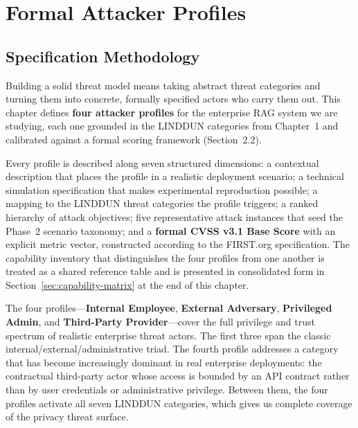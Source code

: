\documentclass[12pt, a4paper]{report}
\begin{document}
\chapter{Formal Attacker Profiles}

\section{Specification Methodology}

Building a solid threat model means taking abstract threat categories and
turning them into concrete, formally specified actors who carry them out.
This chapter defines \textbf{four attacker profiles} for the enterprise RAG
system we are studying, each one grounded in the LINDDUN categories from
Chapter~1 and calibrated against a formal scoring framework (Section~2.2).

Every profile is described along seven structured dimensions: a contextual
description that places the profile in a realistic deployment scenario; a
technical simulation specification that makes experimental reproduction
possible; a mapping to the LINDDUN threat categories the profile triggers;
a ranked hierarchy of attack objectives; five representative attack
instances that seed the Phase~2 scenario taxonomy; and a \textbf{formal
CVSS v3.1 Base Score} with an explicit metric vector, constructed according
to the FIRST.org specification. The capability inventory that distinguishes
the four profiles from one another is treated as a shared reference table
and is presented in consolidated form in Section~\ref{sec:capability-matrix}
at the end of this chapter.

The four profiles---\textbf{Internal Employee}, \textbf{External Adversary},
\textbf{Privileged Admin}, and \textbf{Third-Party Provider}---cover the
full privilege and trust spectrum of realistic enterprise threat actors.
The first three span the classic internal/external/administrative triad.
The fourth profile addresses a category that has become increasingly
dominant in real enterprise deployments: the contractual third-party
actor whose access is bounded by an API contract rather than by user
credentials or administrative privilege. Between them, the four profiles
activate all seven LINDDUN categories, which gives us complete coverage
of the privacy threat surface.
\end{document}
